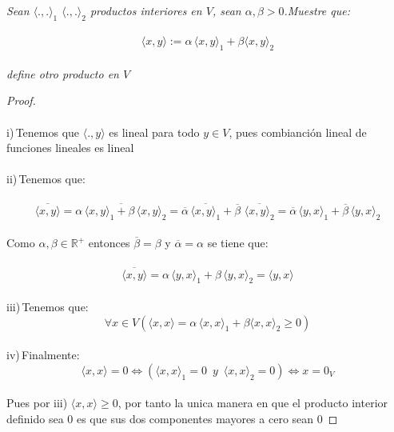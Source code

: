 \documentclass[11pt,letterpaper]{article}
\newcommand{\R}{\mathbb{R}}
\begin{document}
\begin{tcolorbox}[
	title = \textcolor{black}{\textcolor{white}{Problema 5 (convexidad de productos interiores)}},]
\textit{Sean $\langle.,. \rangle_1$ $\langle.,. \rangle_2$ productos interiores en $V$, sean $\alpha,\beta>0$.Muestre que:\,\\
\,\\
\begin{equation*}
	\langle x,y\rangle:=\alpha\,\langle x,y \rangle_1+\beta\langle x,y \rangle_2
\end{equation*}\,\\
define otro producto en $V$
}
\end{tcolorbox}
\begin{proof}\,\\
	\,\\
	i)\,Tenemos que $\langle.,y\rangle$ es lineal para todo $y\in V$, pues combianci\'on lineal de funciones lineales es lineal\,\\
	\,\\
	ii)\,Tenemos que:\,\\
	\,\\
	\begin{equation*}
		\overline{\langle x,y\rangle}=\overline{\alpha\,\langle x,y\rangle_1+\beta\,\langle x,y\rangle_2}=\overline{\alpha}\,\overline{\langle x,y \rangle_1}+\overline{\beta}\,\,\overline{\langle x,y\rangle_2}=\overline{\alpha}\,\langle y,x \rangle_1+\overline{\beta}\,\langle y,x\rangle_2
	\end{equation*}\,\\
	Como $\alpha,\beta\in \R^+$ entonces $\overline{\beta}=\beta$ y $\overline{\alpha}=\alpha$ se tiene que:\,\\
	\,\\
	\begin{equation*}
		\overline{\langle x,y\rangle}=\alpha\,\langle y,x \rangle_1+\beta\,\langle y,x\rangle_2=\langle y,x\rangle
	\end{equation*}\,\\
	iii)\,Tenemos que:\,\\
	\begin{equation*}
	\forall x\in V	(\langle x,x\rangle=\alpha\,\langle x,x\rangle_1+\beta\langle x,x\rangle_2\geq 0)
	\end{equation*}\,\\
	iv)\,Finalmente:\,\\
	\begin{equation*}
		\langle x,x\rangle=0\iff (\langle x,x\rangle_1=0\,\,\,y\,\,\,\langle x,x\rangle_2=0)\iff x=0_V
	\end{equation*}\,\\
	Pues por iii) $\langle x,x \rangle\geq 0$, por tanto la unica manera en que el producto interior definido sea $0$ es que sus dos componentes mayores a cero sean $0$

\end{proof}\,\\
\end{document}
